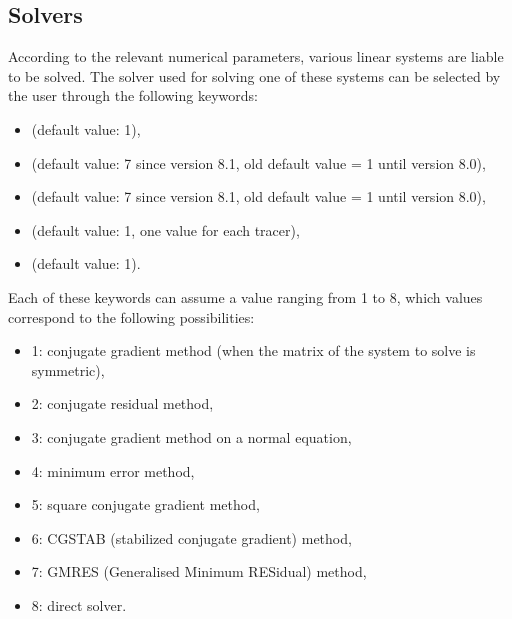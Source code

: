 \subsection{Solvers}
\label{sec:solver}
According to the relevant numerical parameters, various linear systems are
liable to be solved. The solver used for solving one of these systems can be
selected by the user through the following keywords:

\begin{itemize}
\item {} (default value: 1),

\item {} (default value: 7
  since version 8.1, old default value = 1 until version 8.0),

\item {} (default value: 7
  since version 8.1, old default value = 1 until version 8.0),

%
\item {} (default value: 1, one value for
each tracer),

\item {}(default value: 1).
\end{itemize}

Each of these keywords can assume a value ranging from 1 to 8, which values
correspond to the following possibilities:

\begin{itemize}
\item 1: conjugate gradient method (when the matrix of the system to solve
is symmetric),

\item 2: conjugate residual method,

\item 3: conjugate gradient method on a normal equation,

\item 4: minimum error method,

\item 5: square conjugate gradient method,

\item 6: CGSTAB (stabilized conjugate gradient) method,

\item 7: GMRES (Generalised Minimum RESidual) method,

\item 8: direct solver.
\end{itemize}


